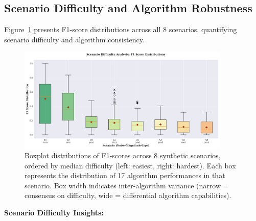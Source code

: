 \documentclass[journal,article,submit,pdftex,moreauthors]{Definitions/mdpi}
\begin{document}
\subsection{Scenario Difficulty and Algorithm Robustness}

Figure~\ref{fig:scenario_difficulty} presents F1-score distributions across all 8 scenarios, quantifying scenario difficulty and algorithm consistency.

\begin{figure}[H]
\centering
\includegraphics[width=0.90\textwidth]{figures/fig_scenario_difficulty.png}
\caption{Boxplot distributions of F1-scores across 8 synthetic scenarios, ordered by median difficulty (left: easiest, right: hardest). Each box represents the distribution of 17 algorithm performances in that scenario. Box width indicates inter-algorithm variance (narrow = consensus on difficulty, wide = differential algorithm capabilities).}
\label{fig:scenario_difficulty}
\end{figure}

\textbf{Scenario Difficulty Insights:}
\end{document}
